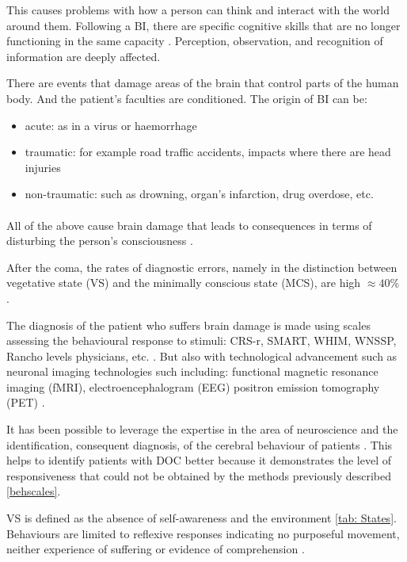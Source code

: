 This causes
problems with how a person can
think and interact with the world around
them. Following a BI, there are
specific cognitive skills that are no
longer functioning in the same capacity \cite{Bender2015}.
Perception, observation, and
recognition of information are deeply affected.

There are events that damage areas of the brain that control parts of the human body. And the patient's faculties are conditioned.
The origin of BI can be: 
\begin{itemize}
    \item acute: as in a virus or haemorrhage  \item traumatic: for example road traffic accidents, impacts where there are head injuries  \item non-traumatic: such as drowning, organ's infarction, drug overdose, etc.
\end{itemize} 
\paragraph{}All of the above cause brain damage that leads to consequences in terms of disturbing the person's consciousness \cite{teixeira2020disorders}.

After the coma, the rates of diagnostic errors, namely in the distinction between vegetative state (VS) and the minimally conscious state (MCS), are high  $\approx 40$\% \cite{andrews1996misdiagnosis}  \cite{ gill2004sensory} \cite{schnakers2009diagnostic}. 

The diagnosis of the patient who suffers brain damage is made using scales assessing the behavioural response to stimuli:
CRS-r, SMART, WHIM, WNSSP, Rancho levels physicians, etc. \citet{Gill-Thwaites2004}. \label{behscales}
But also with technological advancement such as neuronal imaging technologies such including:
   functional magnetic resonance imaging (fMRI),
   electroencephalogram (EEG)
   positron emission tomography (PET)   \cite{King2011} \citet{Da2019} \cite{L2018}.

  It has been possible to leverage the expertise in the area of neuroscience and the identification, consequent diagnosis, of the cerebral behaviour of patients \citep{Bender2015}. This helps to identify patients with DOC better because it demonstrates the level of responsiveness that could not be obtained by the methods previously described \ref{behscales}. 
  
  VS is defined as the absence of self-awareness and the environment \ref{tab: States}. Behaviours are limited to reflexive responses indicating no purposeful movement, neither experience of suffering or evidence of comprehension \citet{multi1994medical}.
  

